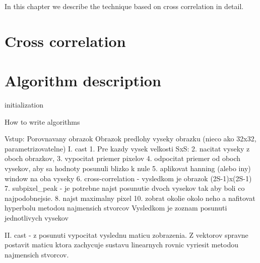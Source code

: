 In this chapter we describe the technique based on cross correlation in detail.

\section{Cross correlation}




\section{Algorithm description}

\begin{algorithm}[H]
	initialization\;
	\caption{How to write algorithms}
\end{algorithm}

Vstup:
Porovnavany obrazok
Obrazok predlohy
vyseky obrazku (nieco ako 32x32, parametrizovatelne)
I. cast
1. Pre kazdy vysek velkosti SxS: 
2. nacitat vyseky z oboch obrazkov,
3. vypocitat priemer pixelov
4. odpocitat priemer od oboch vysekov, aby sa hodnoty posunuli blizko k nule
5. aplikovat hanning (alebo iny) window na oba vyseky
6. cross-correlation - vysledkom je obrazok (2S-1)x(2S-1)
7. subpixel\_peak - je potrebne najst posunutie dvoch vysekov tak aby boli co najpodobnejsie.
8. najst maximalny pixel
10. zobrat okolie okolo neho a nafitovat hyperbolu metodou najmensich stvorcov
Vysledkom je zoznam posunuti jednotlivych vysekov

II. cast - z posunuti vypocitat vyslednu maticu zobrazenia.
Z vektorov spravne postavit maticu ktora zachycuje sustavu linearnych rovnic
vyriesit metodou najmensich stvorcov.

